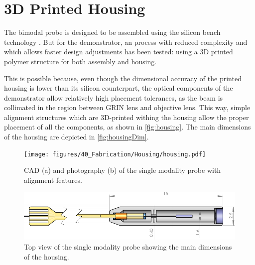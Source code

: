 


\section{3D Printed Housing}

The bimodal probe is designed to be assembled using the silicon bench technology \cite{Kretschmer}. But for the demonstrator, an process with reduced complexity and which allows faster design adjustments has been tested: using a 3D printed polymer structure for both assembly and housing.

This is possible because, even though the dimensional accuracy of the printed housing is lower than its silicon counterpart, the optical components of the demonstrator allow relatively high placement tolerances, as the beam is collimated in the region between GRIN lens and objective lens. This way, simple alignment structures which are 3D-printed withing the housing allow the proper placement of all the components, as shown in \autoref{fig:housing}. The main dimensions of the housing are depicted in \autoref{fig:housingDim}.

\begin{figure}[h!]\centering \texttt{[image: figures/40\_Fabrication/Housing/housing.pdf]}
      \caption{CAD (a) and photography (b) of the single modality probe with alignment features.}
      \label{fig:housing}
\end{figure}

\begin{figure}[h!]\centering \includegraphics[width=\columnwidth]{figures/40_Fabrication/Housing/TopDrawing.pdf}
      \caption{Top view of the single modality probe showing the main dimensions of the housing.}
      \label{fig:housingDim}
\end{figure}

